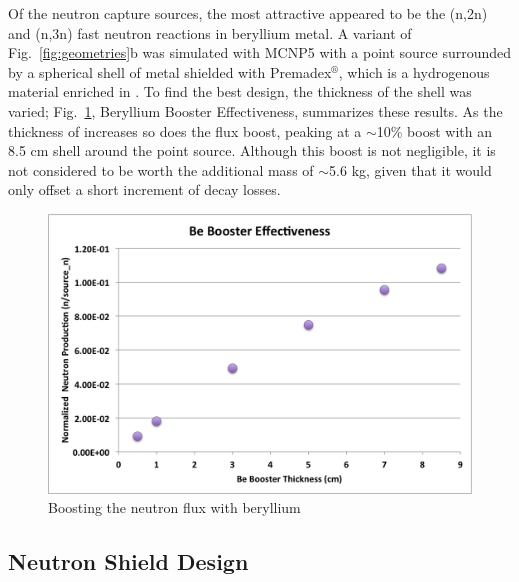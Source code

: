 \documentclass{mc2015}
\begin{document}
Of the neutron capture sources, the most attractive appeared to be the (n,2n) and (n,3n) fast neutron reactions in beryllium metal. A variant of Fig.\ \ref{fig:geometries}b was simulated with MCNP5 with a  point source surrounded by a spherical shell of  metal shielded with Premadex$^\circledR$, which is a hydrogenous material enriched in  \cite{prem}.
To find the best design, the thickness of the  shell was varied; Fig.\ \ref{fig:beboosters}, Beryllium Booster Effectiveness, summarizes these results. As the thickness of  increases so does the flux boost, peaking at a $\sim$10\% boost with an 8.5 cm shell around the point source. Although this boost is not negligible, it is not considered to be worth the additional mass of $\sim$5.6 kg, given that it would only offset a short increment of  decay losses. 

\begin{figure}
  \centering
  \includegraphics[width=4.5in]{Be_boost.png}
  \caption{Boosting the neutron flux with beryllium}
  \label{fig:beboosters}
\end{figure}

\subsection{Neutron Shield Design}
\label{sec:shields}
\end{document}
